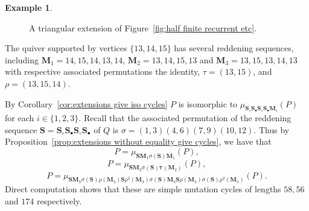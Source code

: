 \documentclass[11pt, letterpaper]{amsart}
\theoremstyle{definition}
\newtheorem{example}[theorem]{Example}
\numberwithin{equation}{section}
\begin{document}
\begin{example}
\begin{figure}[ht]
    \caption{A triangular extension of Figure~\ref{fig:half finite recurrent etc}.}
    \label{fig:half finite triang}
\end{figure}

The quiver supported by vertices $\{13,14,15\}$ has several reddening sequences, including $\mathbf M_1 = 14,15,14,13,14$, $\mathbf M_2 = 13,14,15,13$ and $\mathbf M_3 = 13,15,13,14,13$ with respective associated permutations the identity, $\tau = (13,15)$, and $\rho = (13,15,14)$.

By Corollary~\ref{cor:extensions give iso cycles} $P$ is isomorphic to $\mu_{\mathbf S_\circ \mathbf S_\bullet \mathbf S_\circ \mathbf S_\bullet \mathbf M_i}(P)$ for each $i \in \{1,2,3\}$.
Recall that the associated permutation of the reddening sequence $\mathbf S = \mathbf S_\circ \mathbf S_\bullet \mathbf S_\circ \mathbf S_\bullet$ of $Q$ is $\sigma = (1,3) (4,6)(7,9)(10,12).$ 
Thus by Proposition~\ref{prop:extensions without equality give cycles}, we have that
$$P = \mu_{\mathbf S \mathbf M_1 \sigma(\mathbf S) \mathbf M_1}(P),$$
$$P = \mu_{\mathbf S \mathbf M_2 \sigma(\mathbf S) \mathbf \tau(\mathbf M_2)}(P),$$
$$P = \mu_{\mathbf S \mathbf M_3 \sigma(\mathbf S) \rho(\mathbf M_3) \mathbf S \rho^2(\mathbf M_3) \sigma(\mathbf S) \mathbf M_3 \mathbf S \rho(\mathbf M_3) \sigma(\mathbf S) \rho^2(\mathbf M_3)}(P).$$
Direct computation shows that these are simple mutation cycles of lengths $58, 56$ and $174$ respectively.
\end{example}
\end{document}
